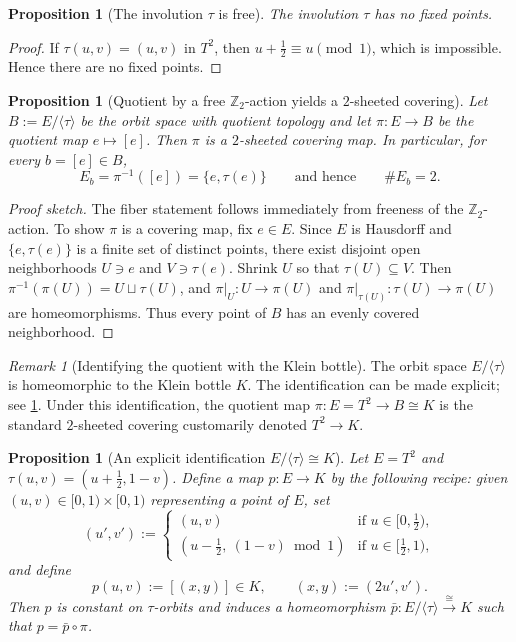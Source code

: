 \documentclass[11pt,a4paper]{article}
\newtheorem{proposition}[theorem]{Proposition}
\theoremstyle{definition}
\theoremstyle{remark}
\newtheorem{remark}[theorem]{Remark}
\begin{document}
\begin{proposition}[The involution \(\tau\) is free]
\label{prop:tau-free}
The involution \(\tau\) has no fixed points.
\end{proposition}

\begin{proof}
If \(\tau(u,v)=(u,v)\) in \(T^2\), then \(u+\tfrac12\equiv u\pmod 1\), which is impossible. Hence there are no fixed points.
\end{proof}

\begin{proposition}[Quotient by a free \(\mathbb{Z}_2\)-action yields a \(2\)-sheeted covering]
\label{prop:free-z2-cover}
Let \(B:=E/\langle\tau\rangle\) be the orbit space with quotient topology and let \(\pi:E\to B\) be the quotient map \(e\mapsto[e]\). Then \(\pi\) is a \(2\)-sheeted covering map. In particular, for every \(b=[e]\in B\),
\[
E_b=\pi^{-1}([e])=\{e,\tau(e)\}
\qquad\text{and hence}\qquad
\#E_b=2.
\]
\end{proposition}

\begin{proof}[Proof sketch]
The fiber statement follows immediately from freeness of the \(\mathbb{Z}_2\)-action. To show \(\pi\) is a covering map, fix \(e\in E\). Since \(E\) is Hausdorff and \(\{e,\tau(e)\}\) is a finite set of distinct points, there exist disjoint open neighborhoods \(U\ni e\) and \(V\ni\tau(e)\). Shrink \(U\) so that \(\tau(U)\subseteq V\). Then \(\pi^{-1}(\pi(U))=U\sqcup\tau(U)\), and \(\pi|_{U}:U\to \pi(U)\) and \(\pi|_{\tau(U)}:\tau(U)\to\pi(U)\) are homeomorphisms. Thus every point of \(B\) has an evenly covered neighborhood.
\end{proof}

\begin{remark}[Identifying the quotient with the Klein bottle]
\label{rem:quotient-is-klein}
The orbit space \(E/\langle\tau\rangle\) is homeomorphic to the Klein bottle \(K\). The identification can be made explicit; see \cref{prop:quotient-is-klein-explicit}. Under this identification, the quotient map \(\pi:E=T^2\to B\cong K\) is the standard \(2\)-sheeted covering customarily denoted \(T^2\to K\).
\end{remark}

\begin{proposition}[An explicit identification \(E/\langle\tau\rangle\cong K\)]
\label{prop:quotient-is-klein-explicit}
Let \(E=T^2\) and \(\tau(u,v)=(u+\tfrac12,1-v)\). Define a map \(p:E\to K\) by the following recipe: given \((u,v)\in[0,1)\times[0,1)\) representing a point of \(E\), set
\[
(u',v') :=
\begin{cases}
(u,v) & \text{if } u\in[0,\tfrac12),\\
(u-\tfrac12,\ (1-v)\bmod 1) & \text{if } u\in[\tfrac12,1),
\end{cases}
\]
and define
\[
p(u,v):=[(x,y)]\in K,
\qquad
(x,y):=(2u',v').
\]
Then \(p\) is constant on \(\tau\)-orbits and induces a homeomorphism \(\bar p: E/\langle\tau\rangle \xrightarrow{\ \cong\ } K\) such that \(p=\bar p\circ \pi\).
\end{proposition}
\end{document}
